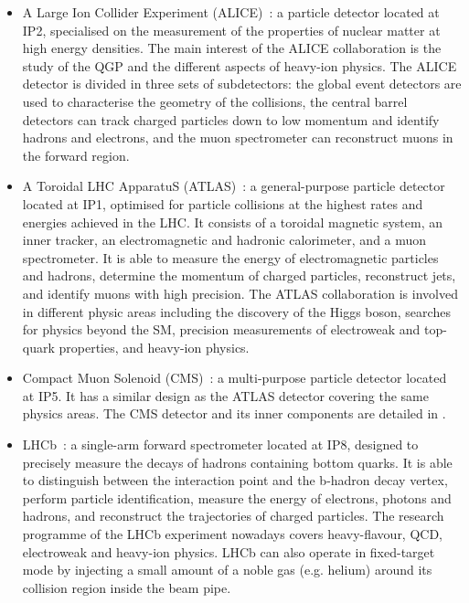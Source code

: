 \begin{itemize}

\item A Large Ion Collider Experiment (ALICE)~\cite{ALICE}: a particle detector located at IP2, specialised on the measurement of the properties of nuclear matter at high energy densities. The main interest of the ALICE collaboration is the study of the QGP and the different aspects of heavy-ion physics. The ALICE detector is divided in three sets of subdetectors: the global event detectors are used to characterise the geometry of the collisions, the central barrel detectors can track charged particles down to low momentum and identify hadrons and electrons, and the muon spectrometer can reconstruct muons in the forward region.

\item A Toroidal LHC ApparatuS (ATLAS)~\cite{ATLAS}: a general-purpose particle detector located at IP1, optimised for particle collisions at the highest rates and energies achieved in the LHC. It consists of a toroidal magnetic system, an inner tracker, an electromagnetic and hadronic calorimeter, and a muon spectrometer. It is able to measure the energy of electromagnetic particles and hadrons, determine the momentum of charged particles, reconstruct jets, and identify muons with high precision. The ATLAS collaboration is involved in different physic areas including the discovery of the Higgs boson, searches for physics beyond the SM, precision measurements of electroweak and top-quark properties, and heavy-ion physics.

\item Compact Muon Solenoid (CMS)~\cite{CMS}: a multi-purpose particle detector located at IP5. It has a similar design as the ATLAS detector covering the same physics areas. The CMS detector and its inner components are detailed in .

\item LHCb~\cite{LHCb}: a single-arm forward spectrometer located at IP8, designed to precisely measure the decays of hadrons containing bottom quarks. It is able to distinguish between the interaction point and the b-hadron decay vertex, perform particle identification, measure the energy of electrons, photons and hadrons, and reconstruct the trajectories of charged particles. The research programme of the LHCb experiment nowadays covers heavy-flavour, QCD, electroweak and heavy-ion physics. LHCb can also operate in fixed-target mode by injecting a small amount of a noble gas (e.g. helium) around its collision region inside the beam pipe.

\end{itemize}


